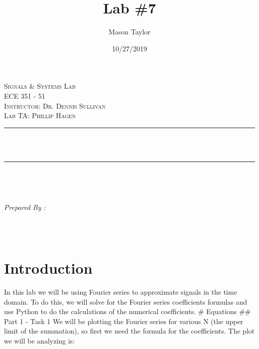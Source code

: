 \documentclass[12pt]{report}
\title{Lab \#7}
\date{10/27/2019}
\author{Mason Taylor}
\makeatletter
\let\thetitle\@title
\let\theauthor\@author
\let\thedate\@date
\makeatother
\begin{document}
    
    
\begin{titlepage}
	\centering
\begin{center}    
    \textsc{\Large Signals \& Systems Lab}\\[2.0 cm]	
    \textsc{\Large ECE 351 - 51}\\[0.5 cm]
    \textsc{\small Instructor: Dr. Dennis Sullivan}\\[0.5 cm]
    \textsc{\small Lab TA: Phillip Hagen}
\end{center}
	\rule{\linewidth}{0.4 mm} \\[0.4 cm]
	{ \huge \bfseries \thetitle}\\
	\rule{\linewidth}{0.4 mm} \\[1.5 cm]
	
	\begin{minipage}{0.4\textwidth}
		\begin{flushleft} \large
			\end{flushleft}
			\end{minipage}~
			\begin{minipage}{0.4\textwidth}
            
			\begin{flushright} \large
			\emph{Prepared By :} \\
			\theauthor  \\
			\thedate
		\end{flushright}  
	\end{minipage}\\[2 cm]
\end{titlepage}
    \tableofcontents
    \pagebreak


    
\hypertarget{introduction}{%
\chapter{Introduction}\label{introduction}}

In this lab we will be using Fourier series to approximate signals in
the time domain. To do this, we will solve for the Fourier series
coefficients formulas and use Python to do the calculations of the
numerical coefficients. \# Equations \#\# Part 1 - Task 1 We will be
plotting the Fourier series for various N (the upper limit of the
summation), so first we need the formula for the coefficients. The plot
we will be analyzing is:
\end{document}
